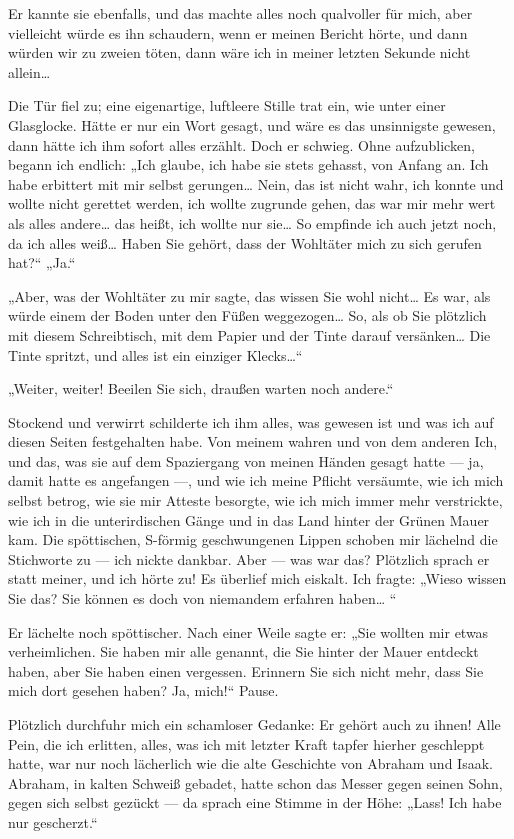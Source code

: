 Er kannte sie ebenfalls, und das machte alles noch qualvoller für
mich, aber vielleicht würde es ihn schaudern, wenn er meinen
Bericht hörte, und dann würden wir zu zweien töten, dann wäre ich
in meiner letzten Sekunde nicht allein\ldots{}

Die Tür fiel zu; eine eigenartige, luftleere Stille trat ein, wie
unter einer Glasglocke. Hätte er nur ein Wort gesagt, und wäre es
das unsinnigste gewesen, dann hätte ich ihm sofort alles erzählt.
Doch er schwieg. Ohne aufzublicken, begann ich endlich: „Ich
glaube, ich habe sie stets gehasst, von Anfang an. Ich habe
erbittert mit mir selbst gerungen\ldots{} Nein, das ist nicht wahr, ich
konnte und wollte nicht gerettet werden, ich wollte zugrunde gehen,
das war mir mehr wert als alles andere\ldots{} das heißt, ich wollte nur
sie\ldots{} So empfinde ich auch jetzt noch, da ich alles weiß\ldots{} Haben
Sie
gehört, dass der Wohltäter mich zu sich gerufen hat?“ „Ja.“

„Aber, was der Wohltäter zu mir sagte, das wissen Sie wohl nicht\ldots{}
Es war, als würde einem der Boden unter den Füßen weggezogen\ldots{} So,
als ob Sie plötzlich mit diesem Schreibtisch, mit dem Papier und
der Tinte darauf versänken\ldots{} Die Tinte spritzt, und alles ist ein
einziger Klecks\ldots{}“

„Weiter, weiter! Beeilen Sie sich, draußen warten noch andere.“

Stockend und verwirrt schilderte ich ihm alles, was gewesen ist und
was ich auf diesen Seiten festgehalten habe. Von meinem wahren und
von dem anderen Ich, und das, was sie auf dem Spaziergang von
meinen Händen gesagt hatte — ja, damit hatte es angefangen —, und
wie ich meine Pflicht versäumte, wie ich mich selbst betrog, wie
sie mir Atteste besorgte, wie ich mich immer mehr verstrickte, wie
ich in die unterirdischen Gänge und in das Land hinter der Grünen
Mauer kam. Die spöttischen, S-förmig geschwungenen Lippen schoben
mir lächelnd die Stichworte zu — ich nickte dankbar. Aber — was war
das? Plötzlich sprach er statt meiner, und ich hörte zu! Es
überlief mich eiskalt. Ich fragte: „Wieso wissen Sie das? Sie
können es doch von niemandem erfahren haben\ldots{} “

Er lächelte noch spöttischer. Nach einer Weile sagte er: „Sie
wollten mir etwas verheimlichen. Sie haben mir alle genannt, die
Sie hinter der Mauer entdeckt haben, aber Sie haben einen
vergessen. Erinnern Sie sich nicht mehr, dass Sie mich dort gesehen
haben? Ja, mich!“ Pause.

Plötzlich durchfuhr mich ein schamloser Gedanke: Er gehört auch zu
ihnen! Alle Pein, die ich erlitten, alles, was
ich mit letzter Kraft tapfer hierher geschleppt hatte, war nur noch
lächerlich wie die alte Geschichte von Abraham und Isaak. Abraham,
in kalten Schweiß gebadet, hatte schon das Messer gegen seinen
Sohn, gegen sich selbst gezückt — da sprach eine Stimme in der
Höhe: „Lass! Ich habe nur gescherzt.“

